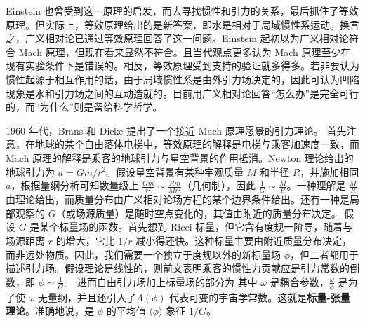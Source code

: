 Einstein 也曾受到这一原理的启发，而去寻找惯性和引力的关系，最后抓住了等效原理。但实际上，等效原理给出的是新答案，即水是相对于局域惯性系运动。换言之，广义相对论已通过等效原理回答了这一问题。Einstein 起初以为广义相对论符合 Mach 原理，但现在看来显然不符合。且当代观点更多认为 Mach 原理至少在现有实验条件下是错误的。相反，等效原理受到支持的验证就多得多。若非要认为惯性起源于相互作用的话，由于局域惯性系是由外引力场决定的，因此可认为凹陷现象是水和引力场之间的互动造就的。目前用广义相对论回答“怎么办”是完全可行的，而“为什么”则是留给科学哲学。

1960 年代，Brans 和 Dicke\cite{Brans-Dicke} 提出了一个接近 Mach 原理愿景的引力理论。
首先注意，在地球的某个自由落体电梯中，等效原理的解释是电梯与乘客加速度一致，而 Mach 原理的解释是乘客的地球引力与星空背景的作用抵消。Newton 理论给出的地球引力为 $a=Gm/r^2$。假设星空背景有某种宇观质量 $M$ 和半径 $R$，并施加相同 $a$，根据量纲分析可知数量级上 $\frac{Gm}{r^2}\sim \frac{Rm}{Mr^2}$（几何制），因此 $\frac{1}{G}\sim\frac{M}{R}$。一种理解是 $\frac{M}{R}$ 由理论给出，而质量分布由广义相对论场方程的某个边界条件给出。还有一种是局部观察的 $G$（或场源质量）是随时空点变化的，其值由附近的质量分布决定。
假设 $G$ 是某个标量场的函数。首先想到 Ricci 标量，但它含有度规一阶导，随着与场源距离 $r$ 的增大，它比 $1/r$ 减小得还快。这种标量主要由附近质量分布决定，而非远处物质。因此，我们需要一个独立于度规以外的新标量场 $\phi$，但二者都用于描述引力场。假设理论是线性的，则前文表明乘客的惯性力贡献应是引力常数的倒数，即 $\phi\sim\frac{1}{G}$。
进而自由引力场加上标量场的部分为
其中 $\omega$ 是耦合参数，$\frac{\omega}{\phi}$ 是为了使 $\omega$ 无量纲，并且还引入了$\Lambda(\phi)$ 代表可变的宇宙学常数。这就是\textbf{标量-张量理论}。准确地说，是
$\phi$ 的平均值 $\langle\phi\rangle$ 象征 $1/G$。

